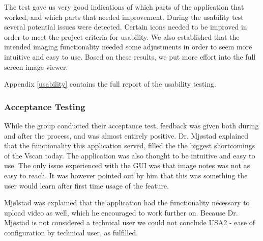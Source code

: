 The test gave us very good indications of which parts of the application that worked, and which parts that needed improvement. 
During the usability test several potential issues were detected. Certain icons needed to be improved in order to meet the project criteria for usability. We also established that the intended imaging functionality needed some adjustments in order to seem more intuitive and easy to use. Based on these results, we put more effort into the full screen image viewer.

Appendix \ref{usability} contains the full report of the usability testing.

\subsubsection{Acceptance Testing}
\label{acceptance_test}
While the group conducted their acceptance test, feedback was given both during and after the process, and was almost entirely positive. Dr. Mjøstad explained that the functionality this application served, filled the the biggest shortcomings of the Vscan today. The application was also thought to be intuitive and easy to use. The only issue experienced with the GUI was that image notes was not as easy to reach.
It was however pointed out by him that this was something the user would learn after first time usage of the feature. 

Mjølstad was explained that the application had the functionality necessary to upload video as well, which he encouraged to work further on. Because Dr. Mjøstad is not considered a technical user we could not conclude USA2 - ease of configuration by technical user, as fulfilled.


